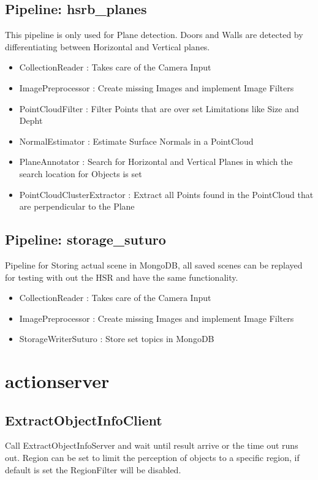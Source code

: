\documentclass[main.tex]{subfiles}
\begin{document}
			\subsection{Pipeline: hsrb\_planes} 
This pipeline is only used for Plane detection. Doors and Walls are detected by differentiating between Horizontal and Vertical planes.
\begin{itemize}
	\item CollectionReader : Takes care of the Camera  Input
	\item ImagePreprocessor : Create missing Images and implement Image Filters 
	\item PointCloudFilter : Filter Points that are over set Limitations like Size and Depht
	\item NormalEstimator : Estimate Surface Normals in a PointCloud 
	\item PlaneAnnotator : Search for Horizontal and Vertical Planes in which the search location for Objects is set
	\item PointCloudClusterExtractor : Extract all Points found in the PointCloud that are perpendicular to the Plane 
\end{itemize}

			\subsection{Pipeline: storage\_suturo} 
Pipeline for Storing actual scene in MongoDB, all saved scenes can be replayed for testing with out the HSR and have the same functionality. 
\begin{itemize}
	\item CollectionReader : Takes care of the Camera  Input
	\item ImagePreprocessor : Create missing Images and implement Image Filters 
	\item StorageWriterSuturo :  Store set topics in MongoDB
\end{itemize}

		\section{actionserver}

			\subsection{ExtractObjectInfoClient}
Call ExtractObjectInfoServer and wait until result arrive or the time out runs out. Region can be set to limit the perception of objects to a specific region, if default is set the RegionFilter will be disabled. 
\end{document}
